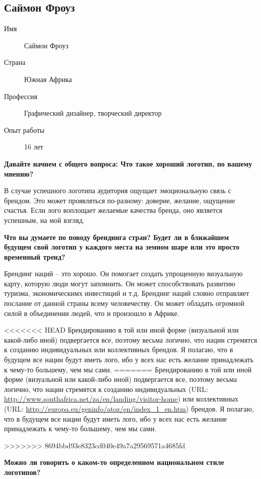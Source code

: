 \clearpage
\subsection{Саймон Фроуз}

\begin{description}
\item[Имя] Саймон Фроуз
\item[Страна] Южная Африка
\item[Профессия] Графический дизайнер, творческий директор
\item[Опыт работы] 16 лет
\end{description}

\textbf{Давайте начнем с общего вопроса: Что такое хороший логотип, по вашему мнению?}

В случае успешного логотипа аудитория ощущает эмоциональную связь с брендом. Это может проявляться по-разному: доверие, желание, ощущение счастья. Если лого воплощает желаемые качества бренда, оно является успешным, на мой взгляд.


\textbf{Что вы думаете по поводу брендинга стран? Будет ли в ближайшем будущем свой логотип у каждого места на земном шаре или это просто временный тренд?}

Брендинг наций – это хорошо. Он помогает создать упрощенную визуальную карту, которую люди могут запомнить. Он может способствовать развитию туризма, экономическимх инвестиций и т.д. Брендинг наций словно отправляет послание от данной страны всему человечеству. Он может обладать огромной силой в объединении людей, что и произошло в Африке.

<<<<<<< HEAD
Брендированию в той или иной форме (визуальной или какой-либо иной) подвергается все, поэтому весьма логично, что нации стремятся к созданию индивидуальных или коллективных брендов. Я полагаю, что в будущем все нации будут иметь лого, ибо у всех нас есть желание принадлежать к чему-то большему, чем мы сами. 
=======
Брендированию в той или иной форме (визуальной или какой-либо иной) подвергается все, поэтому весьма
логично, что нации стремятся к созданию индивидуальных
(URL: \url{http://www.southafrica.net/za/en/landing/visitor-home}) или коллективных
(URL: \url{http://europa.eu/geninfo/atoz/en/index_1_en.htm}) брендов. Я полагаю, что в будущем все нации
будут иметь лого, ибо у всех нас есть желание принадлежать к чему-то большему, чем мы сами.

>>>>>>> 8694bbd93e8323cd040e49a7a29569571a4685fd


\textbf{Можно ли говорить о каком-то определенном национальном стиле логотипов?}

